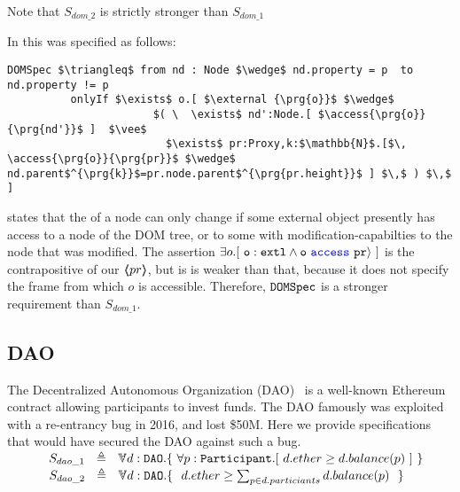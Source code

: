 Note that $S_{dom\_2}$ is strictly stronger than $S_{dom\_1}$

\vspace{.1cm}

In  \cite{OOPSLA22} this was specified as follows:
 
 \begin{lstlisting}[language = Chainmail, mathescape=true, frame=lines]
DOMSpec $\triangleq$ from nd : Node $\wedge$ nd.property = p  to nd.property != p
          onlyIf $\exists$ o.[ $\external {\prg{o}}$ $\wedge$ 
                       $( \  \exists$ nd':Node.[ $\access{\prg{o}}{\prg{nd'}}$ ]  $\vee$ 
                         $\exists$ pr:Proxy,k:$\mathbb{N}$.[$\, \access{\prg{o}}{\prg{pr}}$ $\wedge$ nd.parent$^{\prg{k}}$=pr.node.parent$^{\prg{pr.height}}$ ] $\,$ ) $\,$ ]
\end{lstlisting}

 states that the  of a node can only change if
some external object presently has 
access to a node of the DOM tree, or to some  with modification-capabilties
to the node that was modified.
The assertion $\exists {o}.[\ \mbox{\normalfont{\texttt{o}}}:\mbox{\normalfont{\texttt{extl}}} \wedge  \mbox{\normalfont{\texttt{o}}}\ {\color{blue}\texttt{access}}\ \mbox{\normalfont{\texttt{pr}}} \rangle\ ]$ is the contrapositive of our  $\langle\!\!\langle pr \rangle\!\!\rangle$, but is is weaker than that, because it does not specify the frame from which $o$ is accessible.
Therefore, $\mbox{\normalfont{\texttt{DOMSpec}}}$ is a stronger requirement than $S_{dom\_1}$.

\subsection{DAO}
The Decentralized Autonomous Organization (DAO)~\cite{Dao}  is a well-known Ethereum contract allowing 
participants to invest funds. The DAO famously was exploited with a re-entrancy bug in 2016, 
and lost \$50M. Here we provide specifications that would have secured the DAO against such a 
bug. 
\\ 
$\strut \SPSP  S_{dao\_1}\ \  \triangleq \ \ \TwoStatesN{ d:\prg{DAO}}{\ \forall p:\prg{Participant}. [\ d.ether \geq d.balance(p) \ ]   \ }$ 
\\
$\strut \SPSP  S_{dao\_2}\ \  \triangleq \ \ \TwoStatesN{ d:\prg{DAO}}{\ \ d.ether \geq \sum_{p \in d.particiants} d.balance(p)\  \ }$ 


